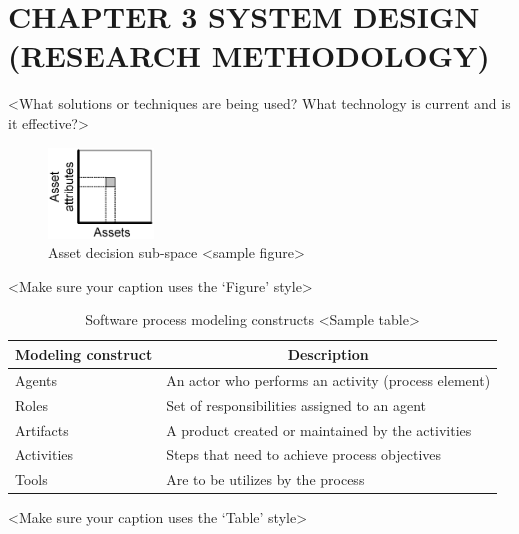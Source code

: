 \chapter[SYSTEM DESIGN (RESEARCH METHODOLOGY)]{\hfill CHAPTER 3 \hfill\null\vskip15pt SYSTEM DESIGN (RESEARCH METHODOLOGY)}

{\textless}What solutions or techniques are being used?  What technology is current and is it effective?{\textgreater}

\begin{figure}[H]
\centering
\includegraphics[width=0.25\textwidth]{img/figure1}
\caption{Asset decision sub-space {\textless}sample figure{\textgreater}}\label{fig:1}
\end{figure}
{\textless}Make sure your caption uses the ‘Figure’ style{\textgreater}

\begin{table}[H]
	\centering
	\caption{Software process modeling constructs {\textless}Sample table{\textgreater}}
	\label{tab:01}
	\begin{tabular}{p{}p{}}
		\toprule
		\multicolumn{1}{c}{\textbf{Modeling construct}} & \multicolumn{1}{c}{\textbf{Description}} \\ \midrule
		Agents & An actor who performs an activity (process element) \\
		Roles & Set of responsibilities assigned to an agent \\
		Artifacts & A product created or maintained by the activities \\
		Activities & Steps that need to achieve process objectives \\
		Tools & Are to be utilizes by the process \\ \bottomrule
	\end{tabular}
\end{table}

{\textless}Make sure your caption uses the ‘Table’ style{\textgreater}